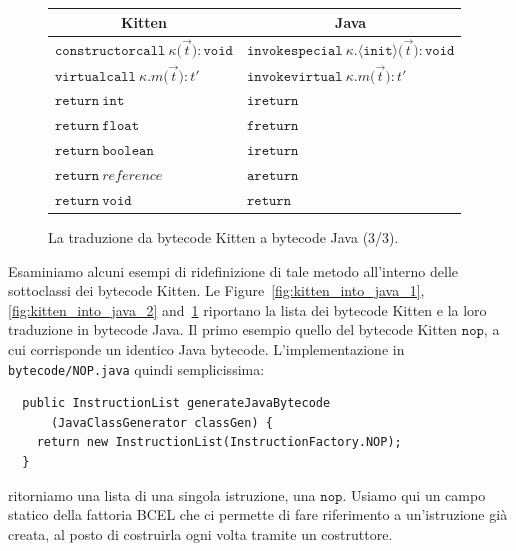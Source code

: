 \begin{figure}
\begin{center}
\begin{tabular}{l|l}
\multicolumn{1}{c}{Kitten} &
\multicolumn{1}{c}{Java} \\\hline\hline
$\mathtt{constructorcall\ \kappa(}$$\vec{t}$$\mathtt{):void}$ & $\mathtt{invokespecial\ \kappa.\langle init\rangle(}$$\vec{t}$$\mathtt{):void}$ \\\hline
$\mathtt{virtualcall\ \kappa.\mathit{m}(}$$\vec{t}$$\mathtt{):\mathit{t'}}$ & $\mathtt{invokevirtual\ \kappa.\mathit{m}(}$$\vec{t}$$\mathtt{):\mathit{t'}}$ \\\hline
$\mathtt{return\ int}$ & $\mathtt{ireturn}$ \\\hline
$\mathtt{return\ float}$ & $\mathtt{freturn}$ \\\hline
$\mathtt{return\ boolean}$ & $\mathtt{ireturn}$ \\\hline
$\mathtt{return}\ \mathit{reference}$ & $\mathtt{areturn}$ \\\hline
$\mathtt{return\ void}$ & $\mathtt{return}$ \\\hline
\end{tabular}
\end{center}
\caption{La traduzione da bytecode Kitten a bytecode Java (3/3).}
  \label{fig:kitten_into_java_3}
\end{figure}

Esaminiamo alcuni esempi di ridefinizione di tale metodo all'interno delle
sottoclassi dei bytecode Kitten. Le Figure~\ref{fig:kitten_into_java_1},
\ref{fig:kitten_into_java_2} and~\ref{fig:kitten_into_java_3} riportano
la lista dei bytecode Kitten e la loro traduzione in bytecode Java. Il primo
esempio \e quello del bytecode Kitten $\mathtt{nop}$, a cui corrisponde un
identico Java bytecode. L'implementazione in \texttt{bytecode/NOP.java} \e quindi semplicissima:
%
\begin{verbatim}
  public InstructionList generateJavaBytecode
      (JavaClassGenerator classGen) {
    return new InstructionList(InstructionFactory.NOP);
  }
\end{verbatim}
%
ritorniamo \cioe una lista di una singola istruzione, una $\mathtt{nop}$. Usiamo qui un
campo statico
della fattoria BCEL che ci permette di fare riferimento a un'istruzione gi\`a creata, al posto
di costruirla ogni volta tramite un costruttore.

